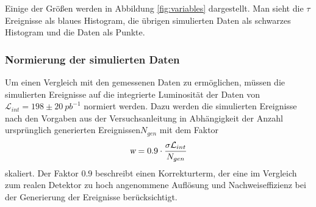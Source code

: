 \documentclass[a4paper,12pt]{article}
\begin{document}
Einige der Größen werden in Abbildung \ref{fig:variables} dargestellt. Man sieht die $τ$ Ereignisse
als blaues Histogram, die übrigen simulierten Daten als schwarzes Histogram und die Daten als
Punkte.
\subsubsection*{Normierung der simulierten Daten}
Um einen Vergleich mit den gemessenen Daten zu ermöglichen, müssen die simulierten Ereignisse auf
die 
integrierte Luminosität der Daten von $\mathcal{L}_{int}=198 \pm \SI{20}{pb^{-1}}$ normiert werden.
Dazu werden die simulierten Ereignisse nach den Vorgaben aus der Versuchsanleitung\cite{versuchsanleitung}
in Abhängigkeit der Anzahl ursprünglich generierten Ereignissen$N_{gen}$ mit dem Faktor
\begin{align*}
	\textsl{w}= 0.9 \cdot \frac{\sigma \mathcal{L}_{int}}{N_{gen}}
\end{align*}
skaliert. Der Faktor $0.9$ beschreibt einen Korrekturterm, der eine im Vergleich zum realen Detektor
zu hoch angenommene Auflösung und Nachweiseffizienz bei der Generierung der Ereignisse berücksichtigt.
\end{document}
